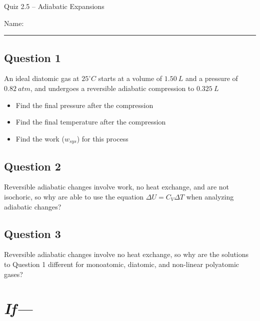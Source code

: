 \documentclass[11pt, letterpaper]{memoir}
\begin{document}
	\begin{center}
		{\large Quiz 2.5 -- Adiabatic Expansions}
	\end{center}
	{\large Name: \rule[-1mm]{4in}{.1pt} 
		
\subsection*{Question 1}
An ideal diatomic gas at $25 ^\circ C$ starts at a volume of $1.50~L$ and a pressure of $0.82~atm$, and undergoes a reversible adiabatic compression to $0.325~L$

\begin{itemize}
	\item Find the final pressure after the compression
	
	\vspace{5em}
	\item Find the final temperature after the compression
	
	\vspace{5em}
	\item Find the work ($w_{sys}$) for this process
	
\end{itemize}

\vspace{5em}
\subsection*{Question 2}
Reversible adiabatic changes involve work, no heat exchange, and are not isochoric, so why are able to use the equation $\Delta U = C_V\Delta T$ when analyzing adiabatic changes?

\vspace{6em}
\subsection*{Question 3}
Reversible adiabatic changes involve no heat exchange, so why are the solutions to Question 1 different for monoatomic, diatomic, and non-linear polyatomic gases?

\newpage
\pagestyle{empty}
\addtocounter{page}{-1}
\section*{\emph{If---}}
}
\end{document}
